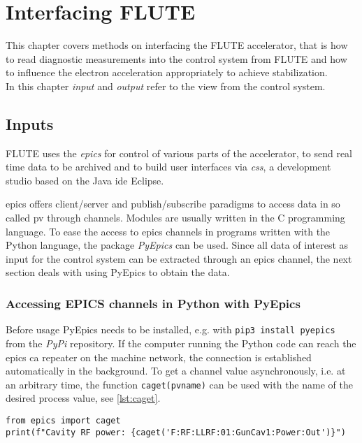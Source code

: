 \chapter{Interfacing FLUTE}
This chapter covers methods on interfacing the FLUTE accelerator, that is how to read diagnostic measurements into the control system from FLUTE and how to influence the electron acceleration appropriately to achieve stabilization.\\
In this chapter \textit{input} and \textit{output} refer to the view from the control system.

\section{Inputs}
FLUTE uses the \textit{\gls{epics}}\cite{Dalesio1991} for control of various parts of the accelerator, to send real time data to be archived and to build user interfaces via \textit{\gls{css}}\cite{CSS2021}, a development studio based on the Java \gls{ide} Eclipse. \cite{Mexner2018}

\Gls{epics} offers client/server and publish/subscribe paradigms to access data in so called \gls{pv} through channels. Modules are usually written in the C programming language. To ease the access to \gls{epics} channels in programs written with the Python language, the package \textit{PyEpics}\cite{Newville2019} can be used. Since all data of interest as input for the control system can be extracted through an \gls{epics} channel, the next section deals with using PyEpics to obtain the data.

\subsection{Accessing EPICS channels in Python with PyEpics}
Before usage PyEpics needs to be installed, e.g. with \texttt{pip3 install pyepics} from the \textit{PyPi} repository. If the computer running the Python code can reach the \gls{epics} \gls{ca} repeater on the machine network, the connection is established automatically in the background. To get a channel value asynchronously, i.e. at an arbitrary time, the function \texttt{caget(pvname)} can be used with the name of the desired process value, see \autoref{lst:caget}.

\begin{lstlisting}[style=python,caption = Using \texttt{caget()} to get the value of an EPICS process value, label = lst:caget]
from epics import caget
print(f"Cavity RF power: {caget('F:RF:LLRF:01:GunCav1:Power:Out')}")
\end{lstlisting}

